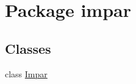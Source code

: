 \hypertarget{namespaceimpar}{}\section{Package impar}
\label{namespaceimpar}
\subsection*{Classes}
\begin{DoxyCompactItemize}
\item 
class \mbox{\hyperlink{classimpar_1_1_impar}{Impar}}
\end{DoxyCompactItemize}
